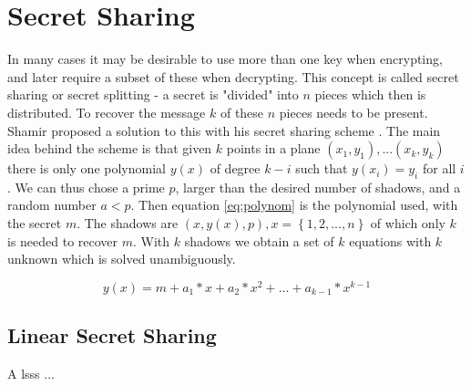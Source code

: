 \section{Secret Sharing}\label{sec:secret_sharing}
In many cases it may be desirable to use more than one key when encrypting, and later require a subset of these when decrypting. This concept is called secret sharing or secret splitting - a secret is "divided" into $n$ pieces which then is distributed. To recover the message $k$ of these $n$ pieces needs to be present. Shamir proposed a solution to this with his secret sharing scheme \cite{shamir_share}. The main idea behind the scheme is that given $k$ points in a plane $(x_1,y_1), ... (x_k,y_k)$ there is only one polynomial $y(x)$ of degree $k-i$ such that $y(x_i) = y_i$ for all $i$. We can thus chose a prime $p$, larger than the desired number of shadows, and a random number $a < p$. Then equation \ref{eq:polynom} is the polynomial used, with the secret $m$. The shadows are $(x, y(x), p) , x=\left\{ {1,2, ... ,n}\right\}$ of which only $k$ is needed to recover $m$. With $k$ shadows we obtain a set of $k$ equations with $k$ unknown which is solved unambiguously.

\begin{equation}
 y(x) = m + a_1*x + a_2*x^2 + ... + a_{k-1} * x^{k-1} 
\end{equation}\label{eq:polynom}


\subsection{Linear Secret Sharing}\label{subsec:lsss}
A \gls{lsss} ... 

